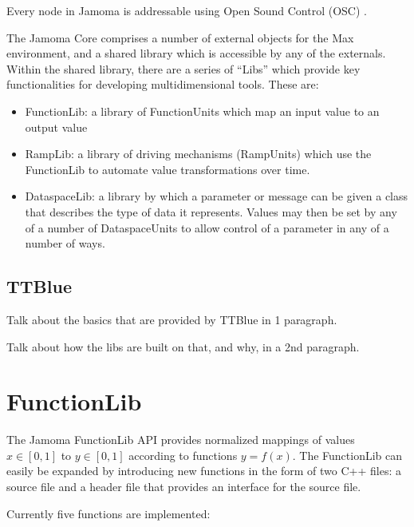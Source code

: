 \documentclass{article}
\begin{document}
\cite{Momeni:2003}

Every node in Jamoma is addressable using Open Sound Control (OSC) \cite{Wright:1997}\cite{Wright:2003}. 

The Jamoma Core comprises a number of external objects for the Max \cite{?} environment, and a shared library which is accessible by any of the externals.  Within the shared library, there are a series of ``Libs'' which provide key functionalities for developing multidimensional tools.  These are:
\begin{itemize}
	\item FunctionLib: a library of FunctionUnits which map an input value to an output value
	\item RampLib: a library of driving mechanisms (RampUnits) which use the FunctionLib to automate value transformations over time.
	\item DataspaceLib: a library by which a parameter or message can be given a class that describes the type of data it represents.  Values may then be set by any of a number of DataspaceUnits to allow control of a parameter in any of a number of ways.
\end{itemize}



\subsection{TTBlue}

Talk about the basics that are provided by TTBlue in 1 paragraph.

Talk about how the libs are built on that, and why, in a 2nd paragraph.




\section{FunctionLib}\label{sec:functionlib}

The Jamoma FunctionLib API provides normalized mappings of values $x \in [0,1]$ to $y \in [0,1]$ according to functions $y = f(x)$. The FunctionLib can easily be expanded by introducing new functions in the form of two C++ files: a source file and a header file that provides an interface for the source file.

Currently five functions are implemented: 
\end{document}
